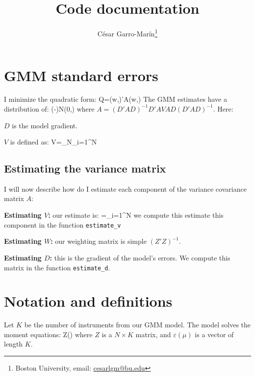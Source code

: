 \documentclass[a4paper, 12pt]{article}
\title{Code documentation}
\author{C\'esar Garro-Mar\'in\thanks{Boston University, email: \href{mailto:cesarlgm@bu.edu}{cesarlgm@bu.edu}}}
\begin{document}
\maketitle

\section{GMM standard errors}
I minimize the quadratic form:
\beqn
Q=\psi(w,\mu)'A\psi(w,\mu)
\eeqn 
The GMM estimates have a distribution of:
\beqns
{}(\hat\mu-\mu)\rightarrow N(0,)
\eeqns
where $A=(D'AD)^{-1}D'AVAD(D'AD)^{-1}$. Here:
\bitem
	\item $D$ is the model gradient.
	\item $V$ is defined as:
	\beqns
		V=\lim_{N\rightarrow\infty}\sum_{i=1}^N
	\eeqns

\eitem

\subsection{Estimating the variance matrix}
I will now describe how do I estimate each component of the variance covariance matrix $A$:
\bitem 
	\item \textbf{Estimating $V$:} our estimate is:
	\beqns
	=\sum_{i=1}^N
	\eeqns
	we compute this estimate this component in the function {\tt estimate\_v}
	\item \textbf{Estimating $W$:} our weighting matrix is simple $(Z'Z)^{-1}$.
	\item \textbf{Estimating $D$:} this is the gradient of the model's errors. We compute this matrix in the function {\tt estimate\_d}.
\eitem


\appendix
\section{Notation and definitions}
Let $K$ be the number of instruments from our GMM model. The model solves the moment equations:
\beqns
	Z\varepsilon(\mu)
\eeqns
where $Z$ is a $N\times K$ matrix, and $\varepsilon(\mu)$ is a vector of length $K$.




\end{document}
